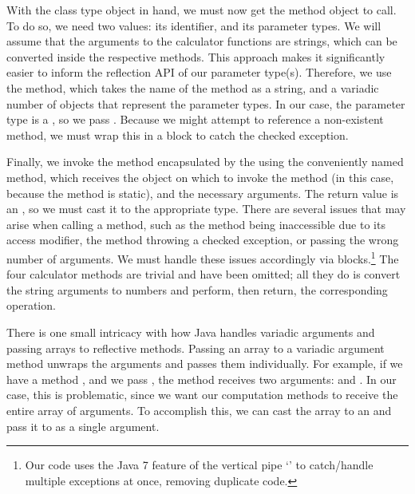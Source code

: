 With the class type object in hand, we must now get the method object to call. 
To do so, we need two values: its identifier, and its parameter types. 
We will assume that the arguments to the calculator functions are strings, which can be converted inside the respective methods. 
This approach makes it significantly easier to inform the reflection API of our parameter type(s). 
Therefore, we use the  method, which takes the name of the method as a string, and a variadic number of  objects that represent the parameter types. 
In our case, the parameter type is a , so we pass . 
Because we might attempt to reference a non-existent method, we must wrap this in a  block to catch the  checked exception.

Finally, we invoke the method encapsulated by the  using the conveniently named  method, which receives the object on which to invoke the method (in this case,  because the method is static), and the necessary arguments. 
The return value is an , so we must cast it to the appropriate type. 
There are several issues that may arise when calling a method, such as the method being inaccessible due to its access modifier, the method throwing a checked exception, or passing the wrong number of arguments. 
We must handle these issues accordingly via  blocks.\footnote{Our code uses the Java 7 feature of the vertical pipe `\ttt{|}' to catch/handle multiple exceptions at once, removing duplicate code.} 
The four calculator methods are trivial and have been omitted; all they do is convert the string arguments to numbers and perform, then return, the corresponding operation.

There is one small intricacy with how Java handles variadic arguments and passing arrays to reflective methods. 
Passing an array to a variadic argument method unwraps the arguments and passes them individually. 
For example, if we have a method , and we pass , the method receives two arguments:  and . 
In our case, this is problematic, since we want our computation methods to receive the entire array of arguments. 
To accomplish this, we can cast the array to an  and pass it to  as a single argument.

